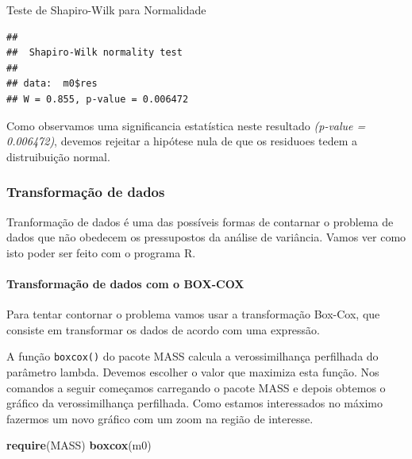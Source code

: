\documentclass[
]{book}
\newenvironment{Shaded}{\begin{snugshade}}{\end{snugshade}}
\newcommand{\KeywordTok}[1]{\textcolor[rgb]{0.13,0.29,0.53}{\textbf{#1}}}
\newcommand{\NormalTok}[1]{#1}
\newcommand{\OperatorTok}[1]{\textcolor[rgb]{0.81,0.36,0.00}{\textbf{#1}}}
\begin{document}
Teste de Shapiro-Wilk para Normalidade

\begin{Shaded}
\end{Shaded}

\begin{verbatim}
## 
##  Shapiro-Wilk normality test
## 
## data:  m0$res
## W = 0.855, p-value = 0.006472
\end{verbatim}

Como observamos uma significancia estatística neste resultado \emph{(p-value = 0.006472)}, devemos rejeitar a hipótese nula de que os residuoes tedem a distruibuição normal.

\hypertarget{transformauxe7uxe3o-de-dados-1}{%
\subsubsection{Transformação de dados}\label{transformauxe7uxe3o-de-dados-1}}

Tranformação de dados é uma das possíveis formas de contarnar o problema de dados que não obedecem os pressupostos da análise de variância. Vamos ver como isto poder ser feito com o programa R.

\hypertarget{transformauxe7uxe3o-de-dados-com-o-box-cox}{%
\paragraph{Transformação de dados com o BOX-COX}\label{transformauxe7uxe3o-de-dados-com-o-box-cox}}

Para tentar contornar o problema vamos usar a transformação Box-Cox, que consiste em transformar os dados de acordo com uma expressão.

A função \texttt{boxcox()} do pacote MASS calcula a verossimilhança perfilhada do parâmetro lambda. Devemos escolher o valor que maximiza esta função. Nos comandos a seguir começamos carregando o pacote MASS e depois obtemos o gráfico da verossimilhança perfilhada. Como estamos interessados no máximo fazermos um novo gráfico com um zoom na região de interesse.

\begin{Shaded}
\begin{Highlighting}[]
\KeywordTok{require}\NormalTok{(MASS) }
  \KeywordTok{boxcox}\NormalTok{(m0)}
\end{Highlighting}
\end{Shaded}
\end{document}
